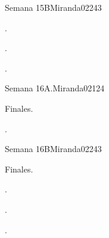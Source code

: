 \begin{syllabus}
\begin{unit}{Semana 15B}{}{Miranda02}{24}{3}
   \begin{learningoutcomes}
      \item . 
      \item .
      \item . 
      \end{learningoutcomes}
\end{unit}

\begin{unit}{Semana 16A.}{}{Miranda02}{12}{4}
   \begin{topics}
      \item Finales.
   \end{topics}
   \begin{learningoutcomes}
      \item . 
   \end{learningoutcomes}
\end{unit}

\begin{unit}{Semana 16B}{}{Miranda02}{24}{3}
   \begin{topics}
      \item Finales.
   \end{topics}

   \begin{learningoutcomes}
      \item . 
      \item .
      \item . 
      \end{learningoutcomes}
\end{unit}



\begin{coursebibliography}
\end{coursebibliography}

\end{syllabus}
